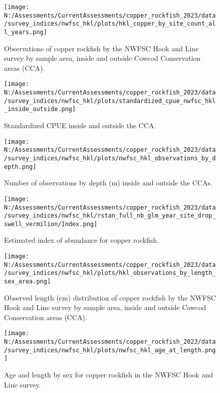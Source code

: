 \documentclass[11pt,
  english,
  letterpaper,
]{article}
\begin{document}
\begin{figure}
\centering
\texttt{[image: N:/Assessments/CurrentAssessments/copper\_rockfish\_2023/data/survey\_indices/nwfsc\_hkl/plots/hkl\_copper\_by\_site\_count\_all\_years.png]}
\caption{Observations of copper rockfish by the NWFSC Hook and Line survey by sample area, inside and outside Cowcod Conservation areas (CCA).\label{fig:nwfsc-hkl-site}}
\end{figure}

\begin{figure}
\centering
\texttt{[image: N:/Assessments/CurrentAssessments/copper\_rockfish\_2023/data/survey\_indices/nwfsc\_hkl/plots/standardized\_cpue\_nwfsc\_hkl\_inside\_outside.png]}
\caption{Standardized CPUE inside and outside the CCA.\label{fig:nwfsc-hkl-cca-main}}
\end{figure}

\begin{figure}
\centering
\texttt{[image: N:/Assessments/CurrentAssessments/copper\_rockfish\_2023/data/survey\_indices/nwfsc\_hkl/plots/nwfsc\_hkl\_observations\_by\_depth.png]}
\caption{Number of observations by depth (m) inside and outside the CCAs.\label{fig:nwfsc-hkl-depth}}
\end{figure}

\begin{figure}
\centering
\texttt{[image: N:/Assessments/CurrentAssessments/copper\_rockfish\_2023/data/survey\_indices/nwfsc\_hkl/rstan\_full\_nb\_glm\_year\_site\_drop\_swell\_vermilion/Index.png]}
\caption{Estimated index of abundance for copper rockfish.\label{fig:nwfsc-hkl-index-main}}
\end{figure}

\begin{figure}
\centering
\texttt{[image: N:/Assessments/CurrentAssessments/copper\_rockfish\_2023/data/survey\_indices/nwfsc\_hkl/plots/hkl\_observations\_by\_length\_sex\_area.png]}
\caption{Observed length (cm) distribution of copper rockfish by the NWFSC Hook and Line survey by sample area, inside and outside Cowcod Conservation areas (CCA).\label{fig:nwfsc-hkl-site-len}}
\end{figure}

\begin{figure}
\centering
\texttt{[image: N:/Assessments/CurrentAssessments/copper\_rockfish\_2023/data/survey\_indices/nwfsc\_hkl/plots/nwfsc\_hkl\_age\_at\_length.png]}
\caption{Age and length by sex for copper rockfish in the NWFSC Hook and Line survey.\label{fig:nwfsc-hkl-len-age}}
\end{figure}
\end{document}
